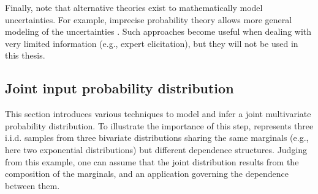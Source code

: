 Finally, note that alternative theories exist to mathematically model uncertainties. 
For example, imprecise probability theory allows more general modeling of the uncertainties \citep{beer_2013_imprecise_proba,schobi_2019_thesis,ajenjo_2023}. 
Such approaches become useful when dealing with very limited information (e.g., expert elicitation), but they will not be used in this thesis. 


\subsection{Joint input probability distribution}

This section introduces various techniques to model and infer a joint multivariate probability distribution. 
To illustrate the importance of this step,  represents three i.i.d. samples from three bivariate distributions sharing the same marginals (e.g., here two exponential distributions) but different dependence structures. 
Judging from this example, one can assume that the joint distribution results from the composition of the marginals, and an application governing the dependence between them. 
